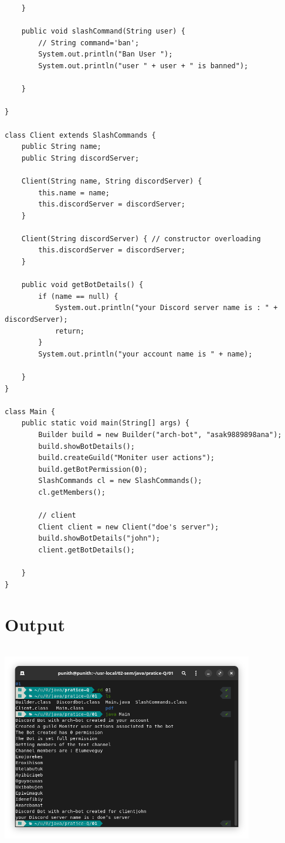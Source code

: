 \documentclass{article}
\begin{document}
\begin{lstlisting}
    }

    public void slashCommand(String user) {
        // String command='ban';
        System.out.println("Ban User ");
        System.out.println("user " + user + " is banned");

    }

}

class Client extends SlashCommands {
    public String name;
    public String discordServer;

    Client(String name, String discordServer) {
        this.name = name;
        this.discordServer = discordServer;
    }

    Client(String discordServer) { // constructor overloading
        this.discordServer = discordServer;
    }

    public void getBotDetails() {
        if (name == null) {
            System.out.println("your Discord server name is : " + discordServer);
            return;
        }
        System.out.println("your account name is " + name);

    }
}

class Main {
    public static void main(String[] args) {
        Builder build = new Builder("arch-bot", "asak9889898ana");
        build.showBotDetails();
        build.createGuild("Moniter user actions");
        build.getBotPermission(0);
        SlashCommands cl = new SlashCommands();
        cl.getMembers();

        // client
        Client client = new Client("doe's server");
        build.showBotDetails("john");
        client.getBotDetails();

    }
}
\end{lstlisting}

\section*{Output}
\includegraphics[width=11cm, height=9cm]{./images/01.png}
\end{document}
